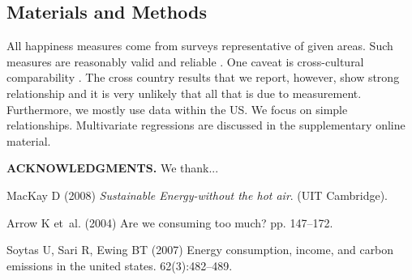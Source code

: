 \documentclass[10pt, letterpaper]{article}
\begin{document}
\begin{spacing}{1.4}



\section*{\large \bf Materials and Methods}
All happiness measures come from surveys representative of given areas. Such measures are reasonably valid and
reliable \cite{diener13b}. %
One caveat is cross-cultural comparability \cite{diener03b}. The cross
country results that we report, however, show  strong relationship and it is very
unlikely that all that is due to measurement. Furthermore, we mostly use data
within the US. %
We focus on simple relationships. Multivariate regressions are
discussed in the supplementary online material. 


\noindent\textbf{ACKNOWLEDGMENTS.} We thank... 


\newpage
%
\begin{thebibliography}{10}

MacKay D (2008) {\em Sustainable Energy-without the hot air}.
\newblock (UIT Cambridge).

Arrow K et~al. (2004) Are we consuming too much?
 pp. 147--172.

Soytas U, Sari R, Ewing BT (2007) Energy consumption, income, and carbon
  emissions in the united states.
 62(3):482--489.


\end{thebibliography}
\end{spacing}
\end{document}
